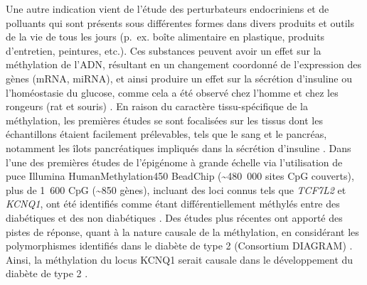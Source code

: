 \documentclass[11pt,a4paper,notrimn]{krantz}
\theoremstyle{definition}
\theoremstyle{definition}
\theoremstyle{remark}
\begin{document}
Une autre indication vient de l'étude des perturbateurs endocriniens et
de polluants qui sont présents sous différentes formes dans divers
produits et outils de la vie de tous les jours (p.~ex. boîte alimentaire
en plastique, produits d'entretien, peintures, etc.). Ces substances
peuvent avoir un effet sur la méthylation de l'ADN, résultant en un
changement coordonné de l'expression des gènes (mRNA, miRNA), et ainsi
produire un effet sur la sécrétion d'insuline \citep{hall_effects_2014}
ou l'homéostasie du glucose, comme cela a été observé chez l'homme
\citep{bi_diabetes_2015} et chez les rongeurs (rat et souris)
\citep{li_f0_2014, rajesh_gestational_2015}. En raison du caractère
tissu-spécifique de la méthylation, les premières études se sont
focalisées sur les tissus dont les échantillons étaient facilement
prélevables, tels que le sang
\citep{bell_integrated_2010, canivell_differential_2014, chambers_epigenome-wide_2015, dayeh_dna_2016, toperoff_genome-wide_2012}
et le pancréas, notamment les îlots pancréatiques impliqués dans la
sécrétion d'insuline
\citep{dayeh_genome-wide_2014, hall_effects_2014, stitzel_global_2010, volkmar_dna_2012}.
Dans l'une des premières études de l'épigénome à grande échelle via
l'utilisation de puce Illumina HumanMethylation450 BeadChip
(\textasciitilde{}480~000 sites CpG couverts), plus de 1~600 CpG
(\textasciitilde{}850 gènes), incluant des loci connus tels que
\emph{TCF7L2} et \emph{KCNQ1}, ont été identifiés comme étant
différentiellement méthylés entre des diabétiques et des non diabétiques
\citep{dayeh_genome-wide_2014}. Des études plus récentes ont apporté des
pistes de réponse, quant à la nature causale de la méthylation, en
considérant les polymorphismes identifiés dans le diabète de type 2
(Consortium DIAGRAM) \citep{morris_large-scale_2012}. Ainsi, la
méthylation du locus KCNQ1 serait causale dans le développement du
diabète de type 2 \citep{elliott_role_2017}.
\end{document}
